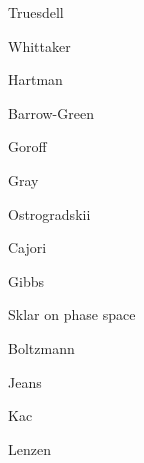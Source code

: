 \documentclass{article}
\theoremstyle{definition}
\begin{document}
Truesdell \cite[pp.~101, 105, 351]{continuum}

Whittaker \cite[p.~323, \S 148]{whittaker}

Hartman \cite[p.~91]{hartman}

Barrow-Green \cite[p.~83]{threebody}

Goroff \cite[p.~I79]{goroff1}

Gray \cite[p.~380]{gray}

Ostrogradskii \cite[pp.~122--123]{kolmogorov3}

Cajori \cite[vol. II, p.~101, \S 464]{cajori}

Gibbs \cite[Chapter XII]{gibbs1902}

Sklar \cite[p.~130]{sklar2013} on phase space

Boltzmann \cite[pp.~274--290, 443]{boltzmann}

Jeans \cite[p.~258, \S 206]{jeans}

Kac \cite[p.~63]{kac}

Lenzen \cite[p.~129]{lenzen}

\nocite{*}



\end{document}
